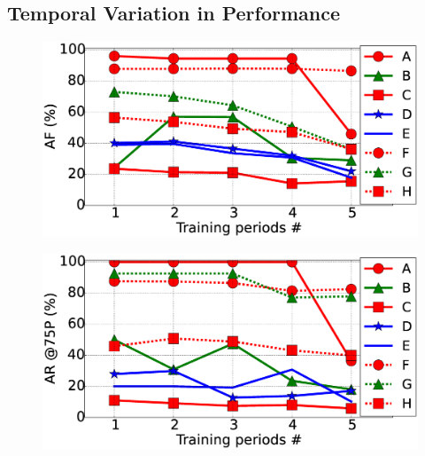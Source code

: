 \subsection{Temporal Variation in Performance}
\begin{figure}
\centering
\begin{minipage}{.95\textwidth}
  \centering
  \includegraphics[width=0.65\linewidth]{FileAccess/figs/VaryTrainFScore10}
  \label{fig:varytrainFscore}
\end{minipage} %
\begin{minipage}{.95\textwidth}
  \centering
  \includegraphics[width=0.65\linewidth]{FileAccess/figs/VaryTrainR7510}
  \label{fig:varytrainR75}
\end{minipage}
\end{figure}

